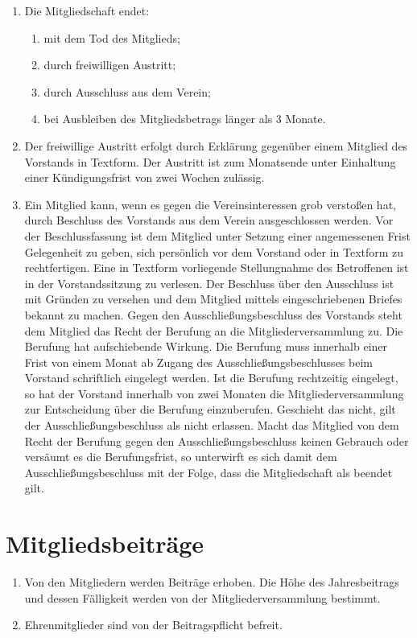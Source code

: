 \begin{enumerate}
	\item Die Mitgliedschaft endet:
		\begin{enumerate}[1)]
			\item mit dem Tod des Mitglieds;
			\item durch freiwilligen Austritt;
			\item durch Ausschluss aus dem Verein;
			\item bei Ausbleiben des Mitgliedsbetrags länger als 3 Monate.
		\end{enumerate}

	\item Der freiwillige Austritt erfolgt durch Erklärung gegenüber einem Mitglied des Vorstands in Textform. Der Austritt ist zum Monatsende unter Einhaltung einer Kündigungsfrist von zwei Wochen zulässig.
	\item Ein Mitglied kann, wenn es gegen die Vereinsinteressen grob verstoßen hat, durch Beschluss des Vorstands aus dem Verein ausgeschlossen werden. Vor der Beschlussfassung ist dem Mitglied unter Setzung einer angemessenen Frist Gelegenheit zu geben, sich persönlich vor dem Vorstand oder in Textform zu rechtfertigen. Eine in Textform vorliegende Stellungnahme des Betroffenen ist in der Vorstandssitzung zu verlesen. Der Beschluss über den Ausschluss ist mit
		Gründen zu versehen und dem Mitglied mittels eingeschriebenen Briefes bekannt zu machen. Gegen den Ausschließungsbeschluss des Vorstands steht dem Mitglied das Recht der Berufung an die Mitgliederversammlung zu. Die Berufung hat aufschiebende Wirkung. Die Berufung muss innerhalb einer Frist von einem Monat ab Zugang des Ausschließungsbeschlusses beim Vorstand schriftlich eingelegt werden. Ist die Berufung rechtzeitig eingelegt, so hat
		der Vorstand innerhalb von zwei Monaten die Mitgliederversammlung zur Entscheidung über die Berufung einzuberufen. Geschieht das nicht, gilt der Ausschließungsbeschluss als nicht erlassen. Macht das Mitglied von dem Recht der Berufung gegen den Ausschließungsbeschluss keinen Gebrauch oder versäumt es die Berufungsfrist, so unterwirft es sich damit dem Ausschließungsbeschluss mit der Folge, dass die Mitgliedschaft als beendet gilt.
\end{enumerate}

\chapter{Mitgliedsbeiträge}
\begin{enumerate}
	\item Von den Mitgliedern werden Beiträge erhoben. Die Höhe des Jahresbeitrags und dessen Fälligkeit werden von der Mitgliederversammlung bestimmt.
	\item Ehrenmitglieder sind von der Beitragspflicht befreit.
\end{enumerate}

